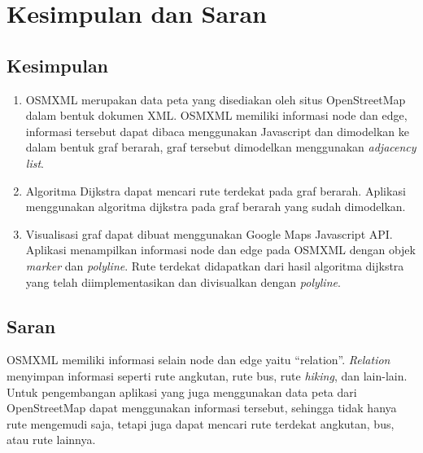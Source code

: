 \chapter{Kesimpulan dan Saran}
\section{Kesimpulan}
\begin{enumerate}
  \item OSMXML merupakan data peta yang disediakan oleh situs
  OpenStreetMap dalam bentuk dokumen XML. OSMXML memiliki informasi node dan
  edge, informasi tersebut dapat dibaca menggunakan Javascript dan dimodelkan 
  ke dalam bentuk graf berarah, graf tersebut dimodelkan menggunakan
  \textit{adjacency list}.
  
  \item Algoritma Dijkstra dapat mencari rute terdekat pada graf berarah.
  Aplikasi menggunakan algoritma dijkstra pada graf berarah yang sudah
  dimodelkan.
  
  \item Visualisasi graf dapat dibuat menggunakan Google Maps Javascript API.
  Aplikasi menampilkan informasi node dan edge pada OSMXML dengan objek
  \textit{marker} dan \textit{polyline}. Rute terdekat didapatkan dari hasil
  algoritma dijkstra yang telah diimplementasikan dan divisualkan dengan
  \textit{polyline}.
\end{enumerate}

\section{Saran}
OSMXML memiliki informasi selain node dan edge yaitu ``relation''.
\textit{Relation} menyimpan informasi seperti rute angkutan, rute bus, rute
\textit{hiking}, dan lain-lain. Untuk pengembangan aplikasi yang juga
menggunakan data peta dari OpenStreetMap dapat menggunakan informasi tersebut,
sehingga tidak hanya rute mengemudi saja, tetapi juga dapat mencari rute
terdekat angkutan, bus, atau rute lainnya.
